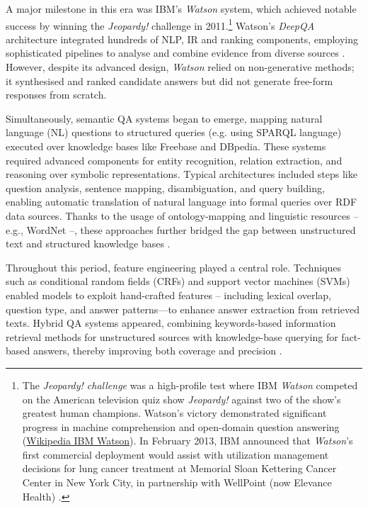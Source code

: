 \begin{spacing}{1.5}
A major milestone in this era was IBM's \textit{Watson} system, which achieved notable success by winning the \textit{Jeopardy!} challenge in 2011.\footnote{The \textit{Jeopardy! challenge} was a high-profile test where IBM \textit{Watson} competed on the American television quiz show \textit{Jeopardy!} against two of the show's greatest human champions. Watson’s victory demonstrated significant progress in machine comprehension and open-domain question answering (\href{https://en.wikipedia.org/w/index.php?title=IBM_Watson&oldid=1301611671}{Wikipedia IBM Watson}). In February 2013, IBM announced that \textit{Watson}'s first commercial deployment would assist with utilization management decisions for lung cancer treatment at Memorial Sloan Kettering Cancer Center in New York City, in partnership with WellPoint (now Elevance Health) \citep{upbin_ibms_2013}.} Watson’s \textit{DeepQA} architecture integrated hundreds of NLP, IR and ranking components, employing sophisticated pipelines to analyse and combine evidence from diverse sources \citep{ferrucci_building_2011}. However, despite its advanced design, \textit{Watson} relied on non-generative methods; it synthesised and ranked candidate answers but did not generate free-form responses from scratch.

Simultaneously, semantic QA systems began to emerge, mapping natural language (NL) questions to structured queries (e.g. using SPARQL language) executed over knowledge bases like Freebase and DBpedia. These systems required advanced components for entity recognition, relation extraction, and reasoning over symbolic representations. Typical architectures included steps like question analysis, sentence mapping, disambiguation, and query building, enabling automatic translation of natural language into formal queries over RDF data sources. Thanks to the usage of ontology-mapping and linguistic resources -- e.g., WordNet --, these approaches further bridged the gap between unstructured text and structured knowledge bases \citep{franco_ontology-based_2020}.

Throughout this period, feature engineering played a central role. Techniques such as conditional random fields (CRFs) and support vector machines (SVMs) enabled models to exploit hand-crafted features -- including lexical overlap, question type, and answer patterns—to enhance answer extraction from retrieved texts. Hybrid QA systems appeared, combining keywords-based information retrieval methods for unstructured sources with knowledge-base querying for fact-based answers, thereby improving both coverage and precision \citep{antoniou_survey_2022}.


\end{spacing}

